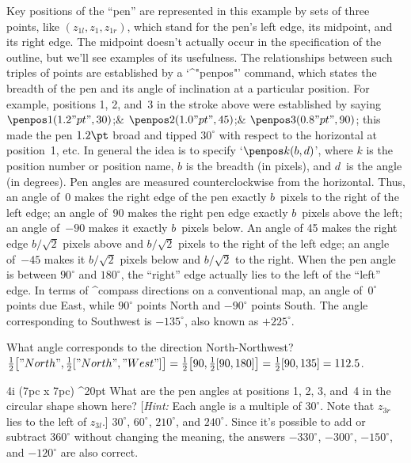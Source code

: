 Key positions of the ``pen'' are represented in this example by sets of
three points, like $(z_{1l},z_1,z_{1r})$, which stand for the pen's left edge,
its midpoint, and its right edge. The midpoint doesn't actually occur in the
specification of the outline, but we'll see examples of its usefulness.
The relationships between such triples of points are established by a
`^"penpos"' command, which states the breadth of the pen and its angle of
inclination at a particular position.  For example, positions 1, 2, and~3
in the stroke above were established by saying
\begindisplay
$\penpos1(1.2"pt",30)$;&
$\penpos2(1.0"pt",45)$;&
$\penpos3(0.8"pt",90)$;\cr
\enddisplay
this made the pen $1.2\pt$ broad and tipped $30^\circ$ with respect to
the horizontal at position~1, etc. In general the idea is to specify
`$\penpos k(b,d)$',
where $k$ is the position number or position name, $b$ is the breadth (in
pixels), and $d$~is the angle (in degrees). Pen angles are measured
counterclockwise from the horizontal. Thus, an angle of~0 makes the right
edge of the pen exactly $b$~pixels to the right of the left edge; an angle
of~90 makes the right pen edge exactly $b$~pixels above the left; an angle
of~$-90$ makes it exactly $b$~pixels below. An angle of 45 makes the right
edge $b/{\sqrt2}$ pixels above and $b/{\sqrt2}$ pixels to the right of the
left edge; an angle of~$-45$ makes it $b/{\sqrt2}$ pixels below and
$b/{\sqrt2}$ to the right. When the pen angle is between $90^\circ$ and
$180^\circ$, the ``right'' edge actually lies to the left of the ``left''
edge. In terms of ^{compass directions} on a conventional map, an angle
of~$0^\circ$ points due East, while $90^\circ$ points North and $-90^\circ$
points South. The angle corresponding to Southwest is $-135^\circ$,
also known as $+225^\circ$.

\exercise What angle corresponds to the direction North-Northwest?
\answer ${1\over2}\bigl["North",{1\over2}["North","West"]\bigr]=
{1\over2}\bigl[90,{1\over2}[90,180]\bigr]={1\over2}[90,135]=112.5$.

\begingroup \decreasehsize 9pc
\exercise \xdef{}%
\rightfig 4i (7pc x 7pc) ^20pt
What are the pen angles at positions 1, 2, 3, and~4 in
the circular shape shown here? [{\sl Hint:\/} Each angle is a multiple
of $30^\circ$. Note that $z_{3r}$ lies to the left of $z_{3l}$.]
\answer $30^\circ$, $60^\circ$, $210^\circ$, and $240^\circ$. Since it's
possible to add or subtract $360^\circ$ without changing the meaning,
the answers $-330^\circ$, $-300^\circ$, $-150^\circ$, and $-120^\circ$
are also correct.


